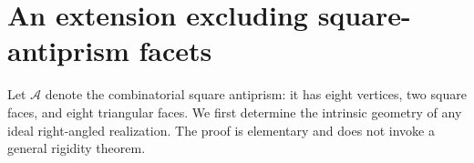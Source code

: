 
\section{An extension excluding square-antiprism facets}
\label{sec:a4extension}

Let \(\mathcal A\) denote the combinatorial square antiprism: it has
eight vertices, two square faces, and eight triangular faces. We first
determine the intrinsic geometry of any ideal right-angled realization.
The proof is elementary and does not invoke a general rigidity theorem.

